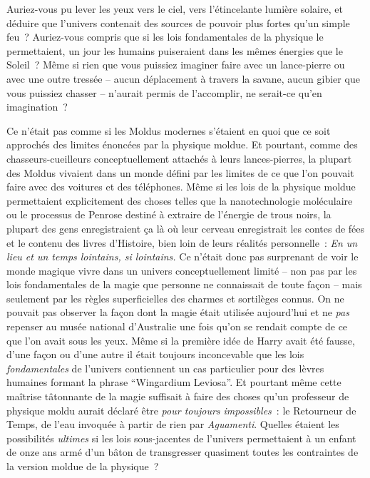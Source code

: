 Auriez-vous pu lever les yeux vers le ciel, vers l'étincelante lumière solaire, et déduire que l'univers contenait des sources de pouvoir plus fortes qu'un simple feu~? Auriez-vous compris que si les lois fondamentales de la physique le permettaient, un jour les humains puiseraient dans les mêmes énergies que le Soleil~? Même si rien que vous puissiez imaginer faire avec un lance-pierre ou avec une outre tressée -- aucun déplacement à travers la savane, aucun gibier que vous puissiez chasser -- n'aurait permis de l'accomplir, ne serait-ce qu'en imagination~?

Ce n'était pas comme si les Moldus modernes s'étaient en quoi que ce soit approchés des limites énoncées par la physique moldue. Et pourtant, comme des chasseurs-cueilleurs conceptuellement attachés à leurs lances-pierres, la plupart des Moldus vivaient dans un monde défini par les limites de ce que l'on pouvait faire avec des voitures et des téléphones. Même si les lois de la physique moldue permettaient explicitement des choses telles que la nanotechnologie moléculaire ou le processus de Penrose destiné à extraire de l'énergie de trous noirs, la plupart des gens enregistraient ça là où leur cerveau enregistrait les contes de fées et le contenu des livres d'Histoire, bien loin de leurs réalités personnelle~: \emph{En un lieu et un temps lointains, si lointains.} Ce n'était donc pas surprenant de voir le monde magique vivre dans un univers conceptuellement limité -- non pas par les lois fondamentales de la magie que personne ne connaissait de toute façon -- mais seulement par les règles superficielles des charmes et sortilèges connus. On ne pouvait pas observer la façon dont la magie était utilisée aujourd'hui et ne \emph{pas} repenser au musée national d'Australie une fois qu'on se rendait compte de ce que l'on avait sous les yeux. Même si la première idée de Harry avait été fausse, d'une façon ou d'une autre il était toujours inconcevable que les lois \emph{fondamentales} de l'univers contiennent un cas particulier pour des lèvres humaines formant la phrase “Wingardium Leviosa”. Et pourtant même cette maîtrise tâtonnante de la magie suffisait à faire des choses qu'un professeur de physique moldu aurait déclaré être \emph{pour toujours impossibles}~: le Retourneur de Temps, de l'eau invoquée à partir de rien par \emph{Aguamenti}. Quelles étaient les possibilités \emph{ultimes} si les lois sous-jacentes de l'univers permettaient à un enfant de onze ans armé d'un bâton de transgresser quasiment toutes les contraintes de la version moldue de la physique~?


